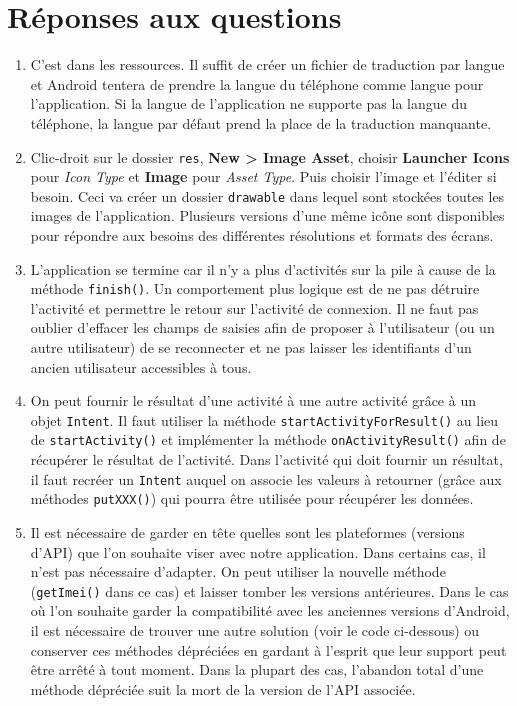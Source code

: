 \documentclass[a4paper]{article}
\begin{document}
\section{Réponses aux questions}

\begin{enumerate}
	\item C'est dans les ressources. Il suffit de créer un fichier de traduction par langue et Android tentera de prendre la langue du téléphone comme langue pour l'application.
    Si la langue de l'application ne supporte pas la langue du téléphone, la langue par défaut prend la place de la traduction manquante.
	
    \item Clic-droit sur le dossier \texttt{res}, \textbf{New > Image Asset}, choisir \textbf{Launcher Icons} pour \textit{Icon Type} et \textbf{Image} pour \textit{Asset Type}. Puis choisir l'image et l'éditer si besoin. Ceci va créer un dossier \texttt{drawable} dans lequel sont stockées toutes les images de l'application. Plusieurs versions d'une même icône sont disponibles pour répondre aux besoins des différentes résolutions et formats des écrans.
    
    \item L'application se termine car il n'y a plus d'activités sur la pile à cause de la méthode \lstinline{finish()}. Un comportement plus logique est de ne pas détruire l'activité et permettre le retour sur l'activité de connexion. Il ne faut pas oublier d'effacer les champs de saisies afin de proposer à l'utilisateur (ou un autre utilisateur) de se reconnecter et ne pas laisser les identifiants d'un ancien utilisateur accessibles à tous.
    
    \item On peut fournir le résultat d'une activité à une autre activité grâce à un objet \lstinline{Intent}. Il faut utiliser la méthode \lstinline{startActivityForResult()} au lieu de \lstinline{startActivity()} et implémenter la méthode \lstinline{onActivityResult()} afin de récupérer le résultat de l'activité. Dans l'activité qui doit fournir un résultat, il faut recréer un \lstinline{Intent} auquel on associe les valeurs à retourner (grâce aux méthodes \lstinline{putXXX()}) qui pourra être utilisée pour récupérer les données.
    
    \item Il est nécessaire de garder en tête quelles sont les plateformes (versions d'API) que l'on souhaite viser avec notre application. Dans certains cas, il n'est pas nécessaire d'adapter. On peut utiliser la nouvelle méthode (\lstinline{getImei()} dans ce cas) et laisser tomber les versions antérieures. Dans le cas où l'on souhaite garder la compatibilité avec les anciennes versions d'Android, il est nécessaire de trouver une autre solution (voir le code ci-dessous) ou conserver ces méthodes dépréciées en gardant à l'esprit que leur support peut être arrêté à tout moment. Dans la plupart des cas, l'abandon total d'une méthode dépréciée suit la mort de la version de l'API associée.
    

\end{enumerate}
\end{document}
